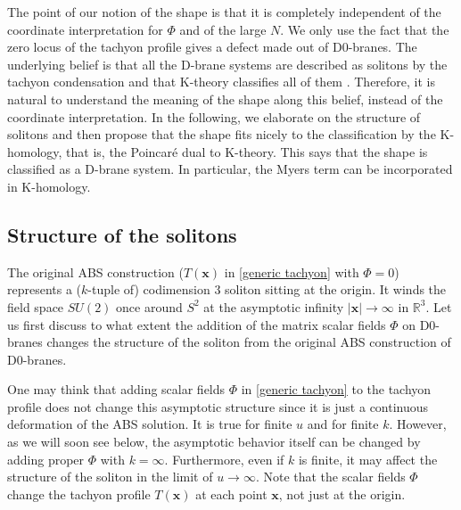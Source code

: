\documentclass[12pt]{article}
\numberwithin{equation}{section}
\def\real{\mathbb{R}}
\begin{document}
The point of our notion of the shape is 
that it is completely independent of 
the coordinate interpretation for $\Phi$ and of the large $N$.
We only use the fact that the zero locus of the tachyon profile 
gives a defect made out of D0-branes.
The underlying belief is that all the D-brane systems are described as solitons by the tachyon condensation and that K-theory classifies all of them \cite{Sen1998,Witten1998}.
{Therefore, it is natural to understand the meaning of the shape along this belief,
instead of the coordinate interpretation.}
In the following, we elaborate on the structure of solitons and 
then propose that the shape fits nicely to the classification by the
K-homology, that is, the Poincar\'{e} dual to K-theory. 
This says that the shape is classified as a D-brane system.
In particular, %
the Myers term 
can be incorporated in K-homology.


\subsection{Structure of the solitons}


The original ABS construction 
($T(\boldsymbol{x})$ in \eqref{generic tachyon} with $\Phi=0$) 
represents a ($k$-tuple of) codimension $3$ soliton sitting at the origin.
It winds the field space $SU(2)$ once  
around $S^2$ at the asymptotic infinity $|\boldsymbol{x}| \to \infty$ in $\real^3$.
Let us first discuss to what extent the addition of the matrix scalar fields $\Phi$ on D0-branes changes the structure of the soliton from the original ABS construction of D0-branes.

One may think that adding scalar fields $\Phi$ in \eqref{generic tachyon} 
to the tachyon profile does not change %
{this asymptotic structure}
since it is just a continuous deformation of the ABS solution. 
It is true 
for finite $u$ and for finite $k$.
However, as we will soon see below, the asymptotic behavior itself can be changed 
by adding proper $\Phi$ with $k=\infty$.
Furthermore, 
even if $k$ is finite, it may affect the structure of the soliton 
in the limit of $u\to\infty$.
Note that the scalar fields $\Phi$ change the tachyon profile $T(\boldsymbol{x})$ at each point $\boldsymbol{x}$, not just at the origin.
\end{document}
